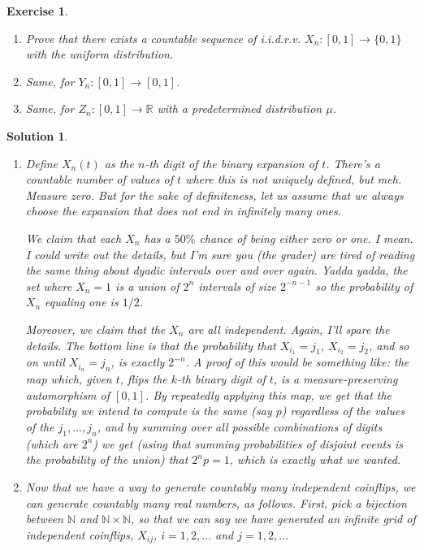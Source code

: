 \documentclass{article}
\newtheorem{ex}{Exercise}
\theoremstyle{nonumberplain}
\newtheorem{sol}{Solution}
\newcommand{\R}{\mathbb{R}}
\newcommand{\N}{\mathbb{N}}
\begin{document}
\begin{ex}
\leavevmode
\begin{enumerate}
\item Prove that there exists a countable sequence of i.i.d.r.v. $X_n \colon [0,1] \to \{0,1\}$ with the uniform distribution.
\item Same, for $Y_n \colon [0,1] \to [0,1]$.
\item Same, for $Z_n \colon [0,1] \to \R$ with a predetermined distribution $\mu$.
\end{enumerate}
\end{ex}

\begin{sol}
\leavevmode
\begin{enumerate}
\item Define $X_n(t)$ as the $n$-th digit of the binary expansion of $t$. There's a countable number of values of $t$ where this is not uniquely defined, but meh. Measure zero. But for the sake of definiteness, let us assume that we always choose the expansion that does not end in infinitely many ones.

We claim that each $X_n$ has a $50\%$ chance of being either zero or one. I mean. I could write out the details, but I'm sure you (the grader) are tired of reading the same thing about dyadic intervals over and over again. Yadda yadda, the set where $X_n = 1$ is a union of $2^n$ intervals of size $2^{-n-1}$ so the probability of $X_n$ equaling one is $1/2$.

Moreover, we claim that the $X_n$ are all independent. Again, I'll spare the details. The bottom line is that the probability that $X_{i_1} = j_1$, $X_{i_2} = j_2$, and so on until $X_{i_n} = j_n$, is exactly $2^{-n}$. A proof of this would be something like: the map which, given $t$, flips the $k$-th binary digit of $t$, is a measure-preserving automorphism of $[0,1]$. By repeatedly applying this map, we get that the probability we intend to compute is the same (say $p$) regardless of the values of the $j_1, \dots, j_n$, and by summing over all possible combinations of digits (which are $2^n$) we get (using that summing probabilities of disjoint events is the probability of the union) that $2^n p = 1$, which is exactly what we wanted.

\item Now that we have a way to generate countably many independent coinflips, we can generate countably many real numbers, as follows. First, pick a bijection between $\N$ and $\N \times \N$, so that we can say we have generated an infinite grid of independent coinflips, $X_{ij}$, $i = 1, 2, \dots$ and $j = 1, 2, \dots$


\end{enumerate}
\end{sol}
\end{document}
